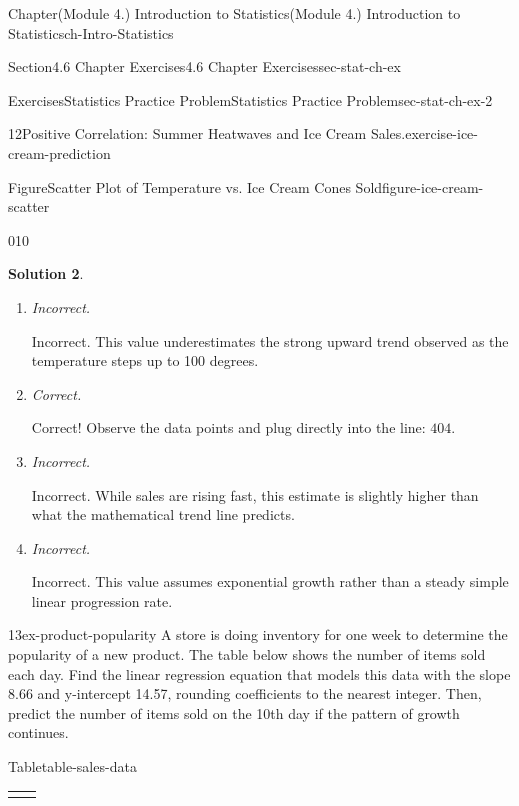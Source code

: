 \documentclass[oneside,10pt,]{book}
\newcommand{\blocktitlefont}{\relax}
\newcommand{\tabularfont}{\relax}
\newcommand{\lititle}[1]{{\slshape#1}}
\newcommand{\hrulethin}  {\noalign{\hrule height 0.04em}}
\begin{document}
\begin{chapterptx}{Chapter}{(Module 4.) Introduction to Statistics}{}{(Module 4.) Introduction to Statistics}{}{}{ch-Intro-Statistics}
\begin{sectionptx}{Section}{4.6 Chapter Exercises}{}{4.6 Chapter Exercises}{}{}{sec-stat-ch-ex}
\begin{exercises-subsection-numberless}{Exercises}{Statistics Practice Problem}{}{Statistics Practice Problem}{}{}{sec-stat-ch-ex-2}
\begin{divisionexercise}{12}{Positive Correlation: Summer Heatwaves and Ice Cream Sales.}{}{exercise-ice-cream-prediction}
\begin{figureptx}{Figure}{Scatter Plot of Temperature vs. Ice Cream Cones Sold}{figure-ice-cream-scatter}{}
\begin{image}{0}{1}{0}{}
{%
}%
\end{image}%
\tcblower
\end{figureptx}%
%
\par\smallskip%
\noindent\textbf{\blocktitlefont Solution 2}.\hypertarget{exercise-ice-cream-prediction-5}{}\quad{}%
\begin{enumerate}[label={\Alph*.}]
\item{}\lititle{Incorrect.}\par%
Incorrect. This value underestimates the strong upward trend observed as the temperature steps up to 100 degrees.%
\item{}\lititle{Correct.}\par%
Correct! Observe the data points and plug directly into the line: \(404\).%
\item{}\lititle{Incorrect.}\par%
Incorrect. While sales are rising fast, this estimate is slightly higher than what the mathematical trend line predicts.%
\item{}\lititle{Incorrect.}\par%
Incorrect. This value assumes exponential growth rather than a steady simple linear progression rate.%
\end{enumerate}
%
\end{divisionexercise}%
\begin{divisionexercise}{13}{}{}{ex-product-popularity}%
A store is doing inventory for one week to determine the popularity of a new product. The table below shows the number of items sold each day. Find the linear regression equation that models this data with the slope 8.66 and y-intercept 14.57, rounding coefficients to the nearest integer. Then, predict the number of items sold on the 10th day if the pattern of growth continues.%
\begin{tableptx}{Table}{\textbf{}}{table-sales-data}{}%
\centering%
{\tabularfont%
\begin{tabular}{cc}\hrulethin

\end{tabular}}
\end{tableptx}
\end{divisionexercise}
\end{exercises-subsection-numberless}
\end{sectionptx}
\end{chapterptx}
\end{document}
